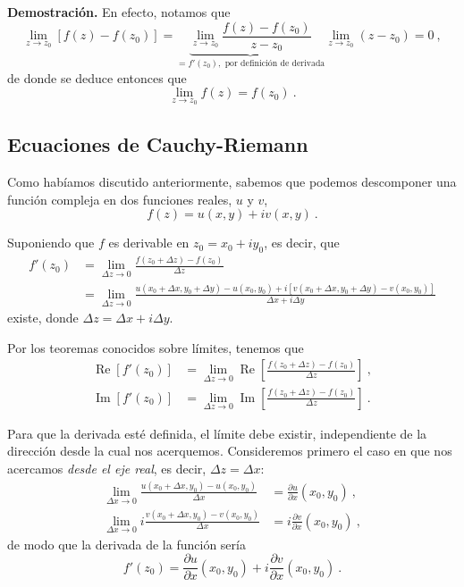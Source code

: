 \begin{demo}
    \textbf{Demostración.} En efecto, notamos que
    \begin{equation*}
        \lim_{z \to z_0}[f(z) - f(z_0)] = \underbrace{\lim_{z \to z_0} \frac{f(z) - f(z_0)}{z-z_0}}_{= f'(z_0), \text{ por definición de derivada}} \lim_{z \to z_0} (z-z_0) = 0 \ ,
    \end{equation*}
    de donde se deduce entonces que
    \begin{equation*}
        \lim_{z \to z_0} f(z) = f(z_0) \ .
    \end{equation*}
\end{demo}

\subsection{Ecuaciones de Cauchy-Riemann}

Como habíamos discutido anteriormente, sabemos que podemos descomponer una función compleja en dos funciones reales, $u$ y $v$,
\begin{equation*}
    f(z) = u(x,y) + iv(x,y) \ . 
\end{equation*}

Suponiendo que $f$ es derivable en $z_0 = x_0 + iy_0$, es decir, que
\begin{align*}
    f'(z_0) & = \lim_{\Delta z \to 0} \frac{f(z_0 + \Delta z) - f(z_0)}{\Delta z} \\
    & = \lim_{\Delta z \to 0} \frac{u(x_0 + \Delta x, y_0 + \Delta y) - u(x_0, y_0) + i[v(x_0 + \Delta x, y_0 + \Delta y) - v(x_0, y_0)]}{\Delta x + i \Delta y}
\end{align*}
existe, donde $\Delta z = \Delta x + i \Delta y$.

Por los teoremas conocidos sobre límites, tenemos que
\begin{align*}
    \operatorname{Re}[f'(z_0)] & = \lim_{\Delta z \to 0} \operatorname{Re} \left[ \frac{f(z_0 + \Delta z) - f(z_0)}{\Delta z} \right] \ , \\
    \operatorname{Im}[f'(z_0)] & = \lim_{\Delta z \to 0} \operatorname{Im} \left[ \frac{f(z_0 + \Delta z) - f(z_0)}{\Delta z} \right] \ .
\end{align*}

Para que la derivada esté definida, el límite debe existir, independiente de la dirección desde la cual nos acerquemos. Consideremos primero el caso en que nos acercamos \emph{desde el eje real}, es decir, $\Delta z = \Delta x$:
\begin{align*}
    \lim_{\Delta x \to 0} \frac{u(x_0 + \Delta x, y_0) - u(x_0, y_0)}{\Delta x} & = \frac{\partial u}{\partial x}(x_0, y_0) \ , \\
    \lim_{\Delta x \to 0} i \frac{v(x_0 + \Delta x, y_0) - v(x_0, y_0)}{\Delta x} & = i \frac{\partial v}{\partial x}(x_0, y_0) \ ,
\end{align*}
de modo que la derivada de la función sería
\begin{equation}\label{eq:derivada_eje_real}
    f'(z_0) = \frac{\partial u}{\partial x}(x_0, y_0) + i \frac{\partial v}{\partial x} (x_0, y_0) \ .
\end{equation}

